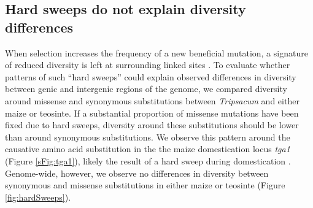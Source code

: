 \documentclass{pnastwo}
\newcommand{\mbh}[1]{\textcolor{blue}{\scriptsize #1}}
\begin{document}
\begin{article}
\subsection{Hard sweeps do not explain diversity differences} %
When selection increases the frequency of a new beneficial mutation, a signature of reduced diversity is left at surrounding linked sites \cite{smith1974}.
To evaluate whether patterns of such ``hard sweeps'' could explain observed differences in diversity between genic and intergenic regions of the genome, we compared diversity around missense and synonymous substitutions between \emph{Tripsacum} and either maize or teosinte.
If a substantial proportion of missense mutations have been fixed due to hard sweeps, diversity around these substitutions should be lower than around synonymous substitutions. 
We observe this pattern around the causative amino acid substitution in the the maize domestication locus \emph{tga1} (Figure \ref{sFig:tga1}), likely the result of a hard sweep during domestication \cite{wang2005, wang2015}. Genome-wide, however, we observe no differences in diversity between synonymous and missense substitutions in either maize or teosinte (Figure \ref{fig:hardSweeps}).



\end{article}
\end{document}
